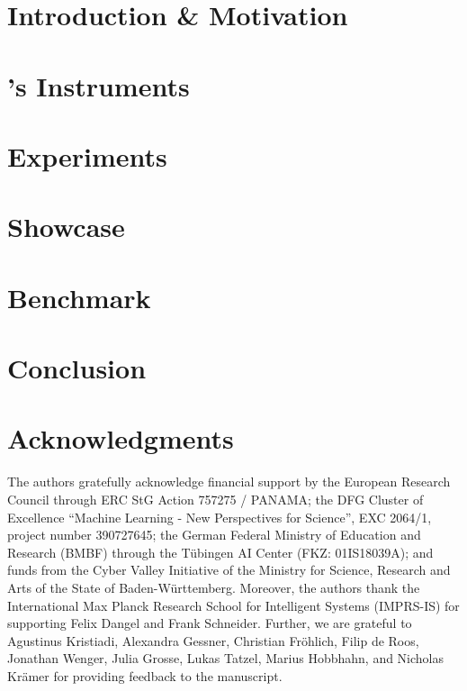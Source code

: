 \section{Introduction \& Motivation}\label{cockpit::sec:intro}


\section{\cockpittitle's Instruments}\label{cockpit::sec:instruments}


\section{Experiments}\label{cockpit::sec:experiments}


\section{Showcase}\label{cockpit::sec:showcase}


\section{Benchmark}\label{cockpit::sec:benchmark}


\section{Conclusion}\label{cockpit::sec:conclusion}


\section*{Acknowledgments}
The authors gratefully acknowledge financial support by the European Research
Council through ERC StG Action 757275 / PANAMA; the DFG Cluster of Excellence
“Machine Learning - New Perspectives for Science”, EXC 2064/1, project number
390727645; the German Federal Ministry of Education and Research (BMBF) through
the Tübingen AI Center (FKZ: 01IS18039A); and funds from the Cyber Valley
Initiative of the Ministry for Science, Research and Arts of the State of
Baden-Württemberg. Moreover, the authors thank the International Max Planck
Research School for Intelligent Systems (IMPRS-IS) for supporting Felix Dangel
and Frank Schneider. Further, we are grateful to Agustinus Kristiadi, Alexandra
Gessner, Christian Fröhlich, Filip de Roos, Jonathan Wenger, Julia Grosse, Lukas
Tatzel, Marius Hobbhahn, and Nicholas Krämer for providing feedback to the
manuscript.

